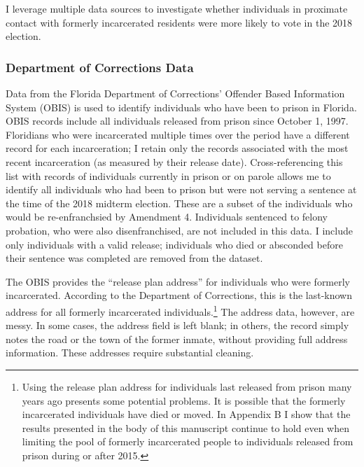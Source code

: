 \documentclass[
  12pt,
]{article}
\begin{document}
I leverage multiple data sources to investigate whether individuals in proximate contact with formerly incarcerated residents were more likely to vote in the 2018 election.

\hypertarget{department-of-corrections-data}{%
\subsubsection*{Department of Corrections Data}\label{department-of-corrections-data}}

Data from the Florida Department of Corrections' Offender Based Information System (OBIS) is used to identify individuals who have been to prison in Florida. OBIS records include all individuals released from prison since October 1, 1997. Floridians who were incarcerated multiple times over the period have a different record for each incarceration; I retain only the records associated with the most recent incarceration (as measured by their release date). Cross-referencing this list with records of individuals currently in prison or on parole allows me to identify all individuals who had been to prison but were not serving a sentence at the time of the 2018 midterm election. These are a subset of the individuals who would be re-enfranchsied by Amendment 4. Individuals sentenced to felony probation, who were also disenfranchised, are not included in this data. I include only individuals with a valid release; individuals who died or absconded before their sentence was completed are removed from the dataset.

The OBIS provides the ``release plan address'' for individuals who were formerly incarcerated. According to the Department of Corrections, this is the last-known address for all formerly incarcerated individuals.\footnote{Using the release plan address for individuals last released from prison many years ago presents some potential problems. It is possible that the formerly incarcerated individuals have died or moved. In Appendix B I show that the results presented in the body of this manuscript continue to hold even when limiting the pool of formerly incarcerated people to individuals released from prison during or after 2015.} The address data, however, are messy. In some cases, the address field is left blank; in others, the record simply notes the road or the town of the former inmate, without providing full address information. These addresses require substantial cleaning.
\end{document}
